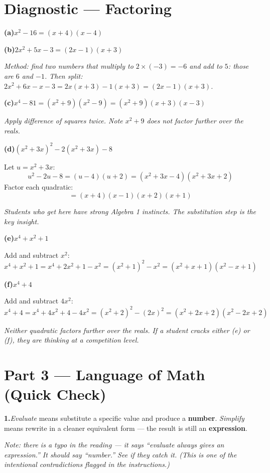 \documentclass[12pt]{article}
\begin{document}
\section*{Diagnostic --- Factoring}

\textbf{(a)}\quad $x^2 - 16 = (x+4)(x-4)$

\textbf{(b)}\quad $2x^2 + 5x - 3 = (2x - 1)(x + 3)$

\textit{Method: find two numbers that multiply to $2\times(-3)=-6$ and add to $5$: those are $6$ and $-1$.
Then split: $2x^2 + 6x - x - 3 = 2x(x+3) - 1(x+3) = (2x-1)(x+3)$.}

\textbf{(c)}\quad $x^4 - 81 = (x^2+9)(x^2-9) = (x^2+9)(x+3)(x-3)$

\textit{Apply difference of squares twice. Note $x^2+9$ does not factor further over the reals.}

\textbf{(d)}\quad $(x^2+3x)^2 - 2(x^2+3x) - 8$

Let $u = x^2 + 3x$:
\[
u^2 - 2u - 8 = (u-4)(u+2) = (x^2+3x-4)(x^2+3x+2)
\]
Factor each quadratic:
\[
= (x+4)(x-1)(x+2)(x+1)
\]

\textit{Students who get here have strong Algebra 1 instincts. The substitution step is the key insight.}

\textbf{(e)}\quad $x^4 + x^2 + 1$

Add and subtract $x^2$:
\[
x^4 + x^2 + 1 = x^4 + 2x^2 + 1 - x^2 = (x^2+1)^2 - x^2 = (x^2+x+1)(x^2-x+1)
\]

\textbf{(f)}\quad $x^4 + 4$

Add and subtract $4x^2$:
\[
x^4 + 4 = x^4 + 4x^2 + 4 - 4x^2 = (x^2+2)^2 - (2x)^2 = (x^2+2x+2)(x^2-2x+2)
\]

\textit{Neither quadratic factors further over the reals.
If a student cracks either (e) or (f), they are thinking at a competition level.}

\section*{Part 3 --- Language of Math (Quick Check)}

\textbf{1.}\quad \textit{Evaluate} means substitute a specific value and produce a \textbf{number}.
\textit{Simplify} means rewrite in a cleaner equivalent form --- the result is still an \textbf{expression}.

\textit{Note: there is a typo in the reading --- it says ``evaluate always gives an expression.''
It should say ``number.'' See if they catch it. (This is one of the intentional contradictions flagged in the instructions.)}
\end{document}
